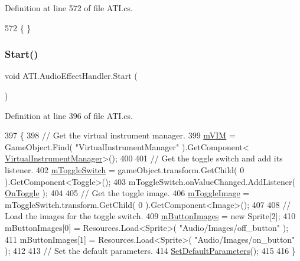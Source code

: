 Definition at line 572 of file A\+T\+I.\+cs.


\begin{DoxyCode}
572 \{ \}
\end{DoxyCode}
\mbox{\label{class_a_t_i_1_1_audio_effect_handler_ad47b6cefdd2bab8bec233069269e76e4}} 
\subsubsection{\texorpdfstring{Start()}{Start()}}
{\footnotesize\ttfamily void A\+T\+I.\+Audio\+Effect\+Handler.\+Start (\begin{DoxyParamCaption}{ }\end{DoxyParamCaption})}



Definition at line 396 of file A\+T\+I.\+cs.


\begin{DoxyCode}
397         \{
398             \textcolor{comment}{// Get the virtual instrument manager.}
399             \hyperlink{class_a_t_i_1_1_audio_effect_handler_a6b5b6149cc376ff0f750ade08ba23bce}{mVIM} = GameObject.Find( \textcolor{stringliteral}{"VirtualInstrumentManager"} ).GetComponent<
      \hyperlink{class_virtual_instrument_manager}{VirtualInstrumentManager}>();
400 
401             \textcolor{comment}{// Get the toggle switch and add its listener.}
402             \hyperlink{class_a_t_i_1_1_audio_effect_handler_ae5f6b965d3401ff17fde2e77f33f9109}{mToggleSwitch} = gameObject.transform.GetChild( 0 ).GetComponent<Toggle>();
403             mToggleSwitch.onValueChanged.AddListener( \hyperlink{class_a_t_i_1_1_audio_effect_handler_aa698c6c69066c8e3f2caa9beeea51569}{OnToggle} );
404 
405             \textcolor{comment}{// Get the toggle image.}
406             \hyperlink{class_a_t_i_1_1_audio_effect_handler_aa5bf03976a14594f089aac5681c15a83}{mToggleImage} = mToggleSwitch.transform.GetChild( 0 ).GetComponent<Image>();
407 
408             \textcolor{comment}{// Load the images for the toggle switch.}
409             \hyperlink{class_a_t_i_1_1_audio_effect_handler_a6e1cfd5449b82870eacd7404a158c7a7}{mButtonImages} = \textcolor{keyword}{new} Sprite[2];
410             mButtonImages[0] = Resources.Load<Sprite>( \textcolor{stringliteral}{"Audio/Images/off\_button"} );
411             mButtonImages[1] = Resources.Load<Sprite>( \textcolor{stringliteral}{"Audio/Images/on\_button"} );
412 
413             \textcolor{comment}{// Set the default parameters.}
414             \hyperlink{class_a_t_i_1_1_audio_effect_handler_a9f2b5ce4ce7b2e3a7cca147a87733a77}{SetDefaultParameters}();
415 
416         \}
\end{DoxyCode}
\mbox{\label{class_a_t_i_1_1_audio_effect_handler_aed35f816dce2a75b857c79ffbb6cc677}} 
